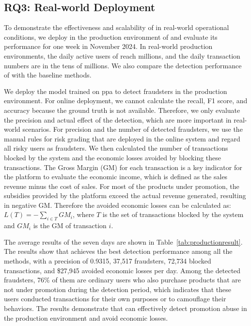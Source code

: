 \subsection{RQ3: Real-world Deployment}
To demonstrate the effectiveness and scalability of \toolname in real-world operational conditions, we deploy \toolname in the production environment of \Company and evaluate its performance for one week in November 2024. In real-world production environments, the daily active users of \Company reach millions, and the daily transaction numbers are in the tens of millions. We also compare the detection performance of \toolname with the baseline methods. 

We deploy the model trained on \ac{ppa} to detect fraudsters in the production environment. 
For online deployment, we cannot calculate the recall, F1 score, and accuracy because the ground truth is not available. Therefore, we only evaluate the precision and actual effect of the detection, which are more important in real-world scenarios.
For precision and the number of detected fraudsters, we use the manual rules for risk grading that are deployed in the online system and regard all risky users as fraudsters. We then calculated the number of transactions blocked by the system and the economic losses avoided by blocking these transactions. The Gross Margin (GM) for each transaction is a key indicator for the platform to evaluate the economic income, which is defined as the sales revenue minus the cost of sales. 
For most of the products under promotion, the subsidies provided by the platform exceed the actual revenue generated, resulting in negative GM. 
Therefore the avoided economic losses can be calculated as: $L(T) = -\sum_{i\in T}{GM_{i}}$, where $T$ is the set of transactions blocked by the system and $GM_{i}$ is the GM of transaction $i$.


The average results of the seven days are shown in Table~\ref{tab:productionresult}.
The results show that \toolname achieves the best detection performance among all the methods, with a precision of 0.9315, 37,517 fraudsters, 72,734 blocked transactions, and \$27,945 avoided economic losses per day. 
Among the detected fraudsters, 76\% of them are ordinary users who also purchase products that are not under promotion during the detection period, which indicates that these users conducted transactions for their own purposes or to camouflage their behaviors. The results demonstrate that \toolname can effectively detect promotion abuse in the production environment and avoid economic losses.


